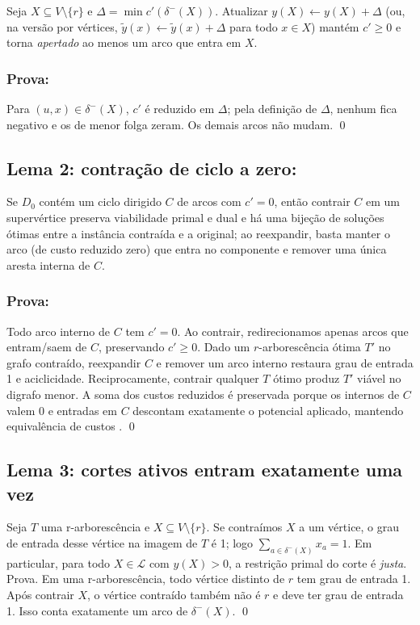 Seja \(X\subseteq V\setminus\{r\}\) e \(\Delta=\min c'(\delta^-(X))\). Atualizar \(y(X)\gets y(X)+\Delta\) (ou, na versão por vértices, \(\tilde y(x)\gets \tilde y(x)+\Delta\) para todo \(x\in X\)) mantém \(c'\ge 0\) e torna \emph{apertado} ao menos um arco que entra em \(X\).\newline

\subsubsection{Prova:} Para \((u,x)\in \delta^-(X)\), \(c'\) é reduzido em \(\Delta\); pela definição de \(\Delta\), nenhum fica negativo e os de menor folga zeram. Os demais arcos não mudam. \qed

\subsection{Lema 2: contração de ciclo a zero:}

Se \(D_0\) contém um ciclo dirigido \(C\) de arcos com \(c'=0\), então contrair \(C\) em um supervértice preserva viabilidade primal e dual e há uma bijeção de soluções ótimas entre a instância contraída e a original; ao reexpandir, basta manter o arco (de custo reduzido zero) que entra no componente e remover uma única aresta interna de \(C\).

\subsubsection{Prova:} Todo arco interno de \(C\) tem \(c'=0\). Ao contrair, redirecionamos apenas arcos que entram/saem de \(C\), preservando \(c'\ge 0\). Dado um \(r\)-arborescência ótima \(T'\) no grafo contraído, reexpandir \(C\) e remover um arco interno restaura grau de entrada 1 e aciclicidade. Reciprocamente, contrair qualquer \(T\) ótimo produz \(T'\) viável no digrafo menor. A soma dos custos reduzidos é preservada porque os internos de \(C\) valem 0 e entradas em \(C\) descontam exatamente o potencial aplicado, mantendo equivalência de custos \cite[Sec.~4.9]{schrijver2003comb}. \qed

\subsection{Lema 3: cortes ativos entram exatamente uma vez}

Seja \(T\) uma r-arborescência e \(X\subseteq V\setminus\{r\}\). Se contraímos \(X\) a um vértice, o grau de entrada desse vértice na imagem de \(T\) é 1; logo \(\sum_{a\in \delta^-(X)} x_a=1\). Em particular, para todo \(X\in\mathcal{L}\) com \(y(X)>0\), a restrição primal do corte é \emph{justa}.\newline
Prova. Em uma r-arborescência, todo vértice distinto de \(r\) tem grau de entrada 1. Após contrair \(X\), o vértice contraído também não é \(r\) e deve ter grau de entrada 1. Isso conta exatamente um arco de \(\delta^-(X)\). \qed

